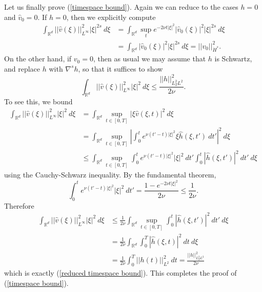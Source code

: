 \documentclass[10pt]{article}
\newcommand{\RR}{\mathbb{R}}
\theoremstyle{definition}
\begin{document}
Let us finally prove (\ref{timespace bound}).
Again we can reduce to the cases $h =0$ and $\hat v_0 = 0$.
If $h = 0$, then we explicitly compute
\begin{align*}
\int_{\RR^d} ||\hat v(\xi)||_{L^\infty}^2 |\xi|^{2s} ~d\xi &= \int_{\RR^d} \sup_t e^{-2\nu t|\xi|^2} |\hat v_0(\xi)|^2 |\xi|^{2s} ~d\xi\\
&= \int_{\RR^d} |\hat v_0(\xi)|^2 |\xi|^{2s} ~d\xi= ||v_0||_{\dot H^s}^2.
\end{align*}
On the other hand, if $v_0 = 0$, then as usual we may assume that $h$ is Schwartz, and replace $h$ with $\nabla^s h$, so that it suffices to show
\begin{equation}
\label{reduced timespace bound}
\int_{\RR^d} ||\hat v(\xi)||_{L^\infty}^2 |\xi|^2 ~d\xi \leq \frac{||h||_{L^2_TL^2}^2}{2\nu}.
\end{equation}
To see this, we bound
\begin{align*}
\int_{\RR^d} ||\hat v(\xi)||_{L^\infty}^2 |\xi|^2 ~d\xi &= \int_{\RR^d} \sup_{t \in [0, T]} |\xi \hat v(\xi, t)|^2 ~d\xi\\
&= \int_{\RR^d} \sup_{t \in [0, T]} \left|\int_0^t e^{\nu(t' - t)|\xi|^2}\xi \hat h(\xi, t') ~dt'\right|^2 ~d\xi\\
&\leq \int_{\RR^d} \sup_{t \in [0, T]} \int_0^t e^{\nu(t' - t)|\xi|^2} |\xi|^2 ~dt' \int_0^t |\hat h(\xi, t')|^2 ~dt' ~d\xi
\end{align*}
using the Cauchy-Schwarz inequality. By the fundamental theorem,
$$\int_0^t e^{\nu(t' - t)|\xi|^2}|\xi|^2 ~dt' = \frac{1 - e^{-2\nu t|\xi|^2}}{2\nu} \leq \frac{1}{2\nu}.$$
Therefore
\begin{align*}
\int_{\RR^d} ||\hat v(\xi)||_{L^\infty}^2 |\xi|^2 ~d\xi &\leq \frac{1}{2\nu}\int_{\RR^d} \sup_{t \in [0, T]} \int_0^t |\hat h(\xi, t')|^2 ~dt' ~d\xi\\
&= \frac{1}{2\nu} \int_{\RR^d} \int_0^T |\hat h(\xi, t)|^2 ~dt~d\xi\\
&= \frac{1}{2\nu} \int_0^T ||h(t)||_{L^2}^2 ~dt = \frac{||h||_{L^2_TL^2}^2}{2\nu}
\end{align*}
which is exactly (\ref{reduced timespace bound}). This completes the proof of (\ref{timespace bound}).
\end{document}
